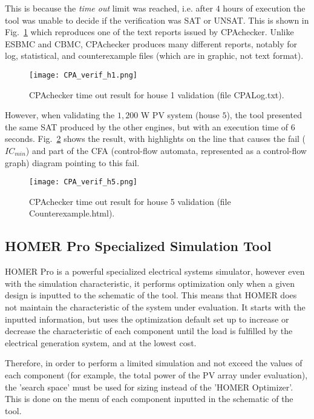 This is because the \textit{time out} limit was reached, i.e. after $4$ hours of execution the tool was unable to decide if the verification was SAT or UNSAT. This is shown in Fig.~\ref{fig:cpavalidh1} which reproduces one of the text reports issued by CPAchecker. Unlike ESBMC and CBMC, CPAchecker produces many different reports, notably for log, statistical, and counterexample files (which are in graphic, not text format).

\begin{figure}[h]
\texttt{[image: CPA\_verif\_h1.png]}
\centering
\caption{CPAchecker time out result for house 1 validation (file CPALog.txt).}
\label{fig:cpavalidh1}
\end{figure}

However, when validating the $1,200$ W PV system (house $5$), the tool presented the same SAT produced by the other engines, but with an execution time of $6$ seconds. Fig.~\ref{fig:cpavalidh5} shows the result, with highlights on the line that causes the fail ($IC_{min}$) and part of the CFA (control-flow automata, represented as a control-flow graph) diagram pointing to this fail.

\begin{figure}[h]
\texttt{[image: CPA\_verif\_h5.png]}
\centering
\caption{CPAchecker time out result for house 5 validation (file Counterexample.html).}
\label{fig:cpavalidh5}
\end{figure}


\subsection{HOMER Pro Specialized Simulation Tool}
\label{sec:homerenviron}

HOMER Pro is a powerful specialized electrical systems simulator, however even with the simulation characteristic, it performs optimization only when a given design is inputted to the schematic of the tool. This means that HOMER does not maintain the characteristic of the system under evaluation. It starts with the inputted information, but uses the optimization default set up to increase or decrease the characteristic of each component until the load is fulfilled by the electrical generation system, and at the lowest cost. 

Therefore, in order to perform a limited simulation and not exceed the values of each component (for example, the total power of the PV array under evaluation), the 'search space' must be used for sizing instead of the 'HOMER Optimizer'. This is done on the menu of each component inputted in the schematic of the tool. 

